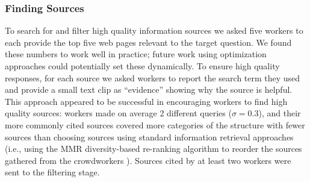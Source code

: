 \subsubsection{Finding Sources}
To search for and filter high quality information sources we asked five workers to each provide the top five web pages relevant to the target question. We found these numbers to work well in practice; future work using optimization approaches \cite{Kamar:2013:LET:2484920.2485011} could potentially set these dynamically. To ensure high quality responses, for each source we asked workers to report the search term they used and provide a small text clip as ``evidence'' showing why the source is helpful. This approach appeared to be successful in encouraging workers to find high quality sources: workers made on average 2 different queries ($\sigma = 0.3$), and their more commonly cited sources covered more categories of the structure with fewer sources than choosing sources using standard information retrieval approaches (i.e., using the MMR diversity-based re-ranking algorithm to reorder the sources gathered from the crowdworkers \cite{carbonell1998use}). Sources cited by at least two workers were sent to the filtering stage.





